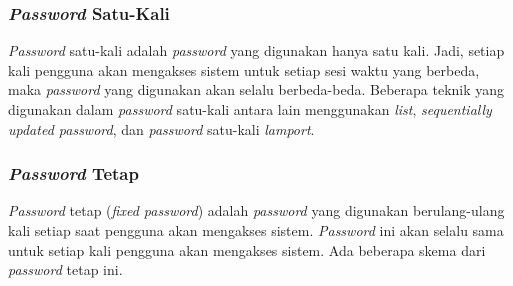 \subsubsection{\textit{Password} Satu-Kali}
\textit{Password} satu-kali adalah \textit{password} yang digunakan hanya satu kali. Jadi, setiap kali pengguna akan mengakses sistem untuk setiap sesi waktu yang berbeda, maka \textit{password} yang digunakan akan selalu berbeda-beda. Beberapa teknik yang digunakan dalam \textit{password} satu-kali antara lain menggunakan \textit{list}, \textit{sequentially updated password}, dan \textit{password} satu-kali \textit{lamport}.

\subsubsection{\textit{Password} Tetap}
\textit{Password} tetap (\textit{fixed password}) adalah \textit{password} yang digunakan berulang-ulang kali setiap saat pengguna akan mengakses sistem. \textit{Password} ini akan selalu sama untuk setiap kali pengguna akan mengakses sistem. Ada beberapa skema dari \textit{password} tetap ini.

